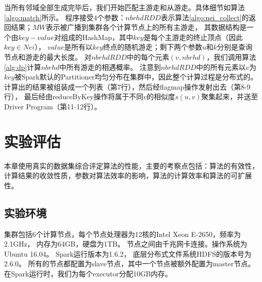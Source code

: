 \documentclass[master]{njuthesis}
\begin{document}
当所有邻域全部生成完毕后，我们开始匹配主游走和从游走。具体细节如算法\ref{algo:match}所示。
程序接受4个参数：$nbrhdRDD$表示算法\ref{algo:nei_collect}的返回结果；$MW$表示被广播到集群各个计算节点上的所有主游走，
其数据结构是一个由$key-value$对组成的HashMap，其中$key$是每个主游走的终止顶点（因此$key \in Nei$），
$value$是所有以$key$终点的随机游走；剩下两个参数$u$和$k$分别是查询节点和游走的最大长度。
对$nbrhdRDD$中的每个元素$(v,nbrhd)$，我们调用算法\ref{alg:dp}计算$nbrhd$中所有游走的相遇概率。
注意到$nbrhdRDD$中的所有元素以$v$为$key$被Spark默认的Partitioner均匀分布在集群中，因此整个计算过程是分布式的。
计算出的结果被组装成一个列表（第7行），然后经flagmap操作发射出去（第8-9行），
最后经由reduceByKey操作将属于不同$v$的相似度$s(u,v)$聚集起来，并送至Driver Program（第11-12行）。

	

\section{实验评估}
本章使用真实的数据集综合评定算法的性能，主要的考察点包括：算法的有效性，计算结果的收敛性质，参数对算法效率的影响，算法的计算效率和算法的可扩展性。
\subsection{实验环境}
集群包括6个计算节点，每个节点处理器为12核的Intel Xeon E-2650，频率为2.1GHz，
内存为64GB，硬盘为1TB。 节点之间由千兆网卡连接。操作系统为Ubuntu 16.04。 
Spark运行版本为1.6.2， 底层分布式文件系统HDFS的版本号为2.6.0。
所有的节点都配置为slave节点，其中一个节点被额外配置为master节点。 
在Spark运行时，我们为每个executor分配10GB内存。
\end{document}
